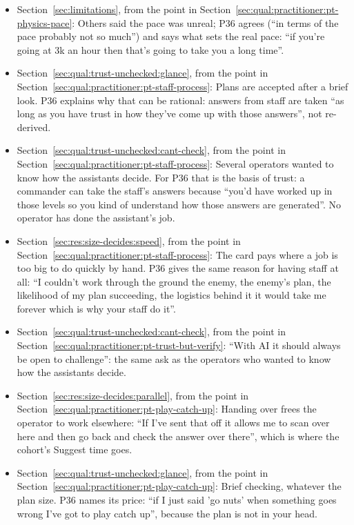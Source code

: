 \begin{itemize}[leftmargin=1.2em,itemsep=1pt]
\item Section~\ref{sec:limitations}, from the point in Section~\ref{sec:qual:practitioner:pt-physics-pace}: Others said the pace was unreal; P36 agrees (``in terms of the pace probably not so much'') and says what sets the real pace: ``if you're going at 3k an hour then that's going to take you a long time''.
\item Section~\ref{sec:qual:trust-unchecked:glance}, from the point in Section~\ref{sec:qual:practitioner:pt-staff-process}: Plans are accepted after a brief look. P36 explains why that can be rational: answers from staff are taken ``as long as you have trust in how they've come up with those answers'', not re-derived.
\item Section~\ref{sec:qual:trust-unchecked:cant-check}, from the point in Section~\ref{sec:qual:practitioner:pt-staff-process}: Several operators wanted to know how the assistants decide. For P36 that is the basis of trust: a commander can take the staff's answers because ``you'd have worked up in those levels so you kind of understand how those answers are generated''. No operator has done the assistant's job.
\item Section~\ref{sec:res:size-decides:speed}, from the point in Section~\ref{sec:qual:practitioner:pt-staff-process}: The card pays where a job is too big to do quickly by hand. P36 gives the same reason for having staff at all: ``I couldn't work through the ground the enemy, the enemy's plan, the likelihood of my plan succeeding, the logistics behind it it would take me forever which is why your staff do it''.
\item Section~\ref{sec:qual:trust-unchecked:cant-check}, from the point in Section~\ref{sec:qual:practitioner:pt-trust-but-verify}: ``With AI it should always be open to challenge'': the same ask as the operators who wanted to know how the assistants decide.
\item Section~\ref{sec:res:size-decides:parallel}, from the point in Section~\ref{sec:qual:practitioner:pt-play-catch-up}: Handing over frees the operator to work elsewhere: ``If I've sent that off it allows me to scan over here and then go back and check the answer over there'', which is where the cohort's Suggest time goes.
\item Section~\ref{sec:qual:trust-unchecked:glance}, from the point in Section~\ref{sec:qual:practitioner:pt-play-catch-up}: Brief checking, whatever the plan size. P36 names its price: ``if I just said 'go nuts' when something goes wrong I've got to play catch up'', because the plan is not in your head.

\end{itemize}
